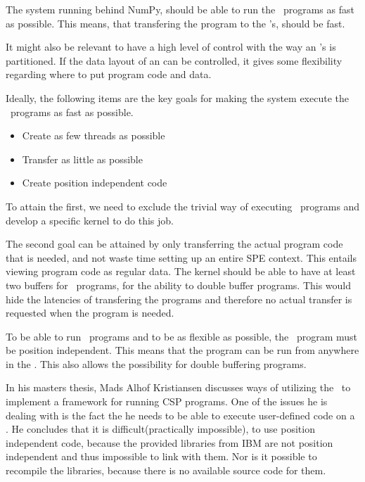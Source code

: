 The system running behind NumPy, should be able to run the \SPE\
programs as fast as possible. This means, that transfering the program
to the \SPE{}'s, should be fast.

It might also be relevant to have a high level of control with the way
an \SPE{}'s \LS{} is partitioned. If the data layout of an \LS{} can be controlled,
it gives some flexibility regarding where to put program code and data.

Ideally, the following items are the key goals for making the system
execute the \SPE\ programs as fast as possible.

\begin{itemize}
\item{Create as few threads as possible}
\item{Transfer as little as possible}
\item{Create position independent code}
\end{itemize}

To attain the first, we need to exclude the trivial way of
executing \SPE\ programs and develop a specific kernel to do this job.

The second goal can be attained by only transferring the actual
program code that is needed, and not waste time setting up an entire
SPE context. This entails viewing program code as regular data. The
kernel should be able to have at least two buffers for \SPE\ programs,
for the ability to double buffer programs. This would hide the
latencies of transfering the programs and therefore no actual transfer
is requested when the program is needed.



To be able to run \SPE\ programs and to be as flexible as possible,
the \SPE\ program must be position independent. This means that the
program can be run from anywhere in the \LS{}. This also allows the
possibility for double buffering programs.

In his masters thesis\cite{cellcsp}, Mads Alhof Kristiansen discusses
ways of utilizing the \CBE\ to implement a framework for running CSP
programs. One of the issues he is dealing with is the fact the he
needs to be able to execute user-defined code on a \SPE{}. He
concludes that it is difficult(practically impossible), to use
position independent code, because the provided libraries from IBM are
not position independent and thus impossible to link with them. Nor is
it possible to recompile the libraries, because there is no available
source code for them.

